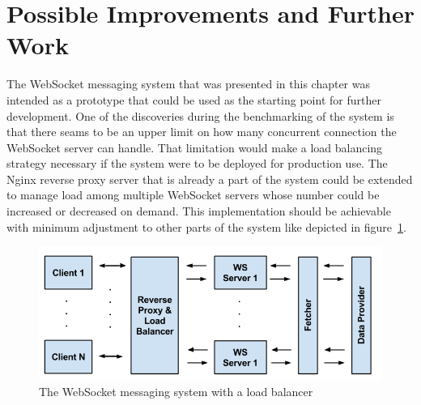 \section{Possible Improvements and Further Work}

The WebSocket messaging system that was presented in this chapter was intended as a prototype that could be used as the starting point for further development. One of the discoveries during the benchmarking of the system is that there seams to be an upper limit on how many concurrent connection the WebSocket server can handle. That limitation would make a load balancing strategy necessary if the system were to be deployed for production use. The Nginx reverse proxy server that is already a part of the system could be extended to manage load among multiple WebSocket servers whose number could be increased or decreased on demand. This implementation should be achievable with minimum adjustment to other parts of the system like depicted in figure~\ref{fig:websocketMessagingSystemLoadBalancer}.
\\
\begin{figure}[h!]
	\centering
	\includegraphics[width=1\textwidth]{images/websocketMessagingSystemLoadBalancer}
	\caption{The WebSocket messaging system with a load balancer}
	\label{fig:websocketMessagingSystemLoadBalancer}
\end{figure}

